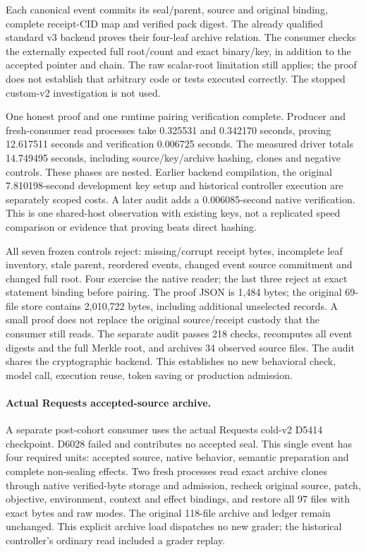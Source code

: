 Each canonical event commits its seal/parent, source and original binding,
complete receipt-CID map and verified pack digest. The already qualified
standard v3 backend proves their four-leaf archive relation. The consumer
checks the externally expected full root/count and exact binary/key, in addition
to the accepted pointer and chain. The raw scalar-root limitation still applies;
the proof does not establish that arbitrary code or tests executed correctly.
The stopped custom-v2 investigation is not used.

One honest proof and one runtime pairing verification complete. Producer and
fresh-consumer read processes take 0.325531 and 0.342170 seconds, proving
12.617511 seconds and verification 0.006725 seconds. The measured driver
totals 14.749495 seconds, including source/key/archive hashing, clones and
negative controls. These phases are nested. Earlier backend compilation, the
original 7.810198-second development key setup and historical controller
execution are separately scoped costs. A later audit adds a 0.006085-second
native verification. This is one shared-host observation with existing keys,
not a replicated speed comparison or evidence that proving beats direct hashing.

All seven frozen controls reject: missing/corrupt receipt bytes, incomplete
leaf inventory, stale parent, reordered events, changed event source commitment
and changed full root. Four exercise the native reader; the last three reject
at exact statement binding before pairing. The proof JSON is 1,484 bytes;
the original 69-file store contains 2,010,722 bytes, including additional
unselected records. A small proof does not replace the original source/receipt
custody that the consumer still reads. The separate audit passes 218 checks,
recomputes all event digests and the full Merkle root, and archives 34 observed
source files. The audit shares the cryptographic backend. This establishes
no new behavioral check, model call, execution reuse, token saving or
production admission.


\paragraph{Actual Requests accepted-source archive.}
A separate post-cohort consumer uses the actual Requests cold-v2 D5414
checkpoint. D6028 failed and contributes no accepted seal. This single event
has four required units: accepted source, native behavior, semantic preparation
and complete non-sealing effects. Two fresh processes read exact archive clones
through native verified-byte storage and admission, recheck original source,
patch, objective, environment, context and effect bindings, and restore all
97 files with exact bytes and raw modes. The original 118-file archive and
ledger remain unchanged. This explicit archive load dispatches no new grader;
the historical controller's ordinary read included a grader replay.

